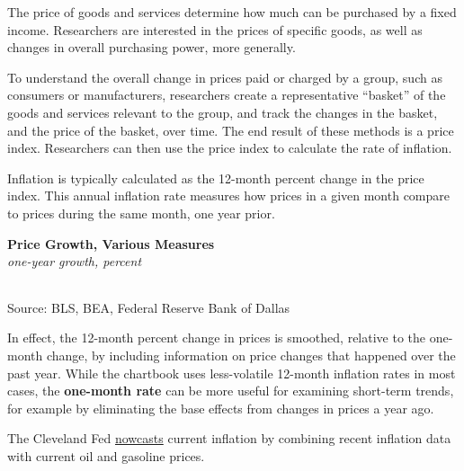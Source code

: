 \documentclass{report}
\begin{document}
{\begin{minipage}{0.76\textwidth}
\small The price of goods and services determine how much can be purchased by a fixed income. Researchers are interested in the prices of specific goods, as well as changes in overall purchasing power, more generally.

To understand the overall change in prices paid or charged by a group, such as consumers or manufacturers, researchers create a representative ``basket'' of the goods and services relevant to the group, and track the changes in the basket, and the price of the basket, over time. The end result of these methods is a price index. Researchers can then use the price index to calculate the rate of inflation.

Inflation is typically calculated as the 12-month percent change in the price index. This annual inflation rate measures how prices in a given month compare to prices during the same month, one year prior. 
\vspace{1mm}

\normalsize \textbf{Price Growth, Various Measures}\\
\footnotesize{\textit{one-year growth, percent}}
\vspace*{-4mm}

\hspace*{-2mm}  \setlength{\tabcolsep}{3.1pt} \color{black!90}
	{\renewcommand{\arraystretch}{1.5}
		\begin{tabular}{p{30mm} R{7.6mm} R{7.6mm} R{7.6mm} R{7.6mm} R{7.6mm} R{7.6mm} 
		   R{9.2mm} R{8.5mm}}
			  \hline
		\end{tabular}}\vspace{-1mm}
		
\footnotesize{Source: BLS, BEA, Federal Reserve Bank of Dallas}
\vspace{2mm}

\small In effect, the 12-month percent change in prices is smoothed, relative to the one-month change, by including information on price changes that happened over the past year. While the chartbook uses less-volatile 12-month inflation rates in most cases, the \textbf{one-month rate} can be more useful for examining short-term trends, for example by eliminating the base effects from changes in prices a year ago. 

 The Cleveland Fed \href{https://www.clevelandfed.org/indicators-and-data/inflation-nowcasting}{nowcasts} current inflation by combining recent inflation data with current oil and gasoline prices. 
\vspace{1mm}


\end{minipage}}
\end{document}
